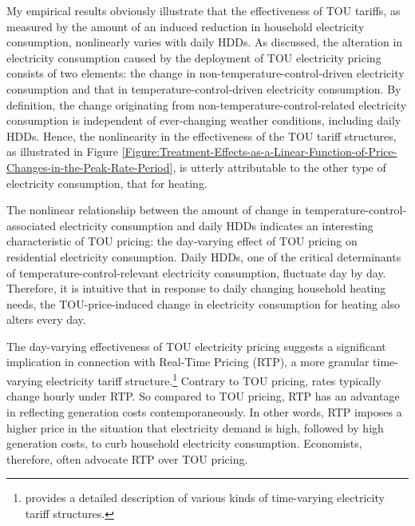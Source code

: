 My empirical results obviously illustrate that the effectiveness of TOU tariffs, as measured by the amount of an induced reduction in household electricity consumption, nonlinearly varies with daily HDDs. As discussed, the alteration in electricity consumption caused by the deployment of TOU electricity pricing consists of two elements: the change in non-temperature-control-driven electricity consumption and that in temperature-control-driven electricity consumption. By definition, the change originating from non-temperature-control-related electricity consumption is independent of ever-changing weather conditions, including daily HDDs. Hence, the nonlinearity in the effectiveness of the TOU tariff structures, as illustrated in Figure \ref{Figure:Treatment-Effects-as-a-Linear-Function-of-Price-Changes-in-the-Peak-Rate-Period}, is utterly attributable to the other type of electricity consumption, that for heating. 

The nonlinear relationship between the amount of change in temperature-control-associated electricity consumption and daily HDDs indicates an interesting characteristic of TOU pricing: the day-varying effect of TOU pricing on residential electricity consumption. Daily HDDs, one of the critical determinants of temperature-control-relevant electricity consumption, fluctuate day by day. Therefore, it is intuitive that in response to daily changing household heating needs, the TOU-price-induced change in electricity consumption for heating also alters every day. 

The day-varying effectiveness of TOU electricity pricing suggests a significant implication in connection with Real-Time Pricing (RTP), a more granular time-varying electricity tariff structure.\footnote{\cite{Household-Responses-to-Time-Varying-Electricity-Prices_Harding-and-Sexton_2017} provides a detailed description of various kinds of time-varying electricity tariff structures.} Contrary to TOU pricing, rates typically change hourly under RTP. So compared to TOU pricing, RTP has an advantage in reflecting generation costs contemporaneously. In other words, RTP imposes a higher price in the situation that electricity demand is high, followed by high generation costs, to curb household electricity consumption. Economists, therefore, often advocate RTP over TOU pricing. 

